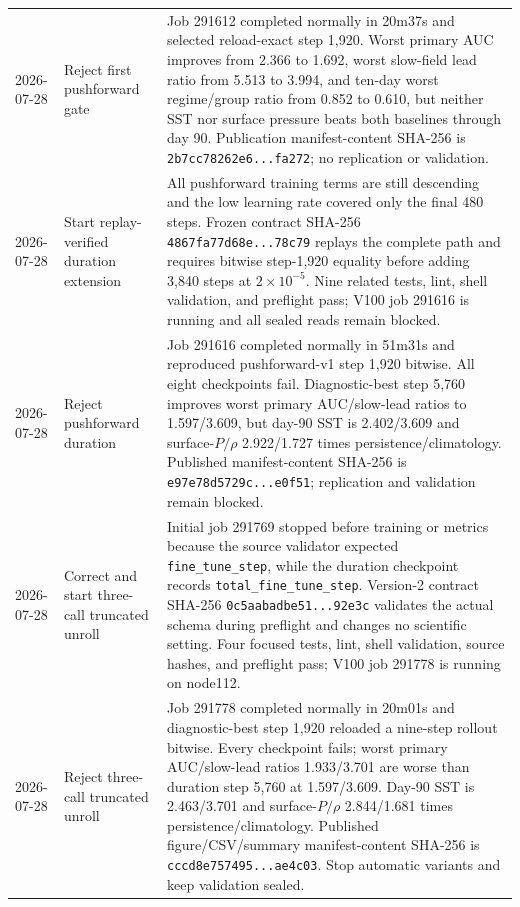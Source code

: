 \documentclass[11pt]{article}
\begin{document}
\begin{longtable}{@{}p{}p{}p{}@{}}
2026-07-28 & Reject first pushforward gate & Job 291612 completed normally in 20m37s and selected reload-exact step 1,920.  Worst primary AUC improves from 2.366 to 1.692, worst slow-field lead ratio from 5.513 to 3.994, and ten-day worst regime/group ratio from 0.852 to 0.610, but neither SST nor surface pressure beats both baselines through day 90.  Publication manifest-content SHA-256 is \texttt{2b7cc78262e6...fa272}; no replication or validation. \\
2026-07-28 & Start replay-verified duration extension & All pushforward training terms are still descending and the low learning rate covered only the final 480 steps.  Frozen contract SHA-256 \texttt{4867fa77d68e...78c79} replays the complete path and requires bitwise step-1,920 equality before adding 3,840 steps at \(2\times10^{-5}\).  Nine related tests, lint, shell validation, and preflight pass; V100 job 291616 is running and all sealed reads remain blocked. \\
2026-07-28 & Reject pushforward duration & Job 291616 completed normally in 51m31s and reproduced pushforward-v1 step 1,920 bitwise.  All eight checkpoints fail.  Diagnostic-best step 5,760 improves worst primary AUC/slow-lead ratios to 1.597/3.609, but day-90 SST is 2.402/3.609 and surface-\(P/\rho\) 2.922/1.727 times persistence/climatology.  Published manifest-content SHA-256 is \texttt{e97e78d5729c...e0f51}; replication and validation remain blocked. \\
2026-07-28 & Correct and start three-call truncated unroll & Initial job 291769 stopped before training or metrics because the source validator expected \texttt{fine\_tune\_step}, while the duration checkpoint records \texttt{total\_fine\_tune\_step}.  Version-2 contract SHA-256 \texttt{0c5aabadbe51...92e3c} validates the actual schema during preflight and changes no scientific setting.  Four focused tests, lint, shell validation, source hashes, and preflight pass; V100 job 291778 is running on node112. \\
2026-07-28 & Reject three-call truncated unroll & Job 291778 completed normally in 20m01s and diagnostic-best step 1,920 reloaded a nine-step rollout bitwise.  Every checkpoint fails; worst primary AUC/slow-lead ratios 1.933/3.701 are worse than duration step 5,760 at 1.597/3.609.  Day-90 SST is 2.463/3.701 and surface-\(P/\rho\) 2.844/1.681 times persistence/climatology.  Published figure/CSV/summary manifest-content SHA-256 is \texttt{cccd8e757495...ae4c03}.  Stop automatic variants and keep validation sealed. \\

\end{longtable}
\end{document}
